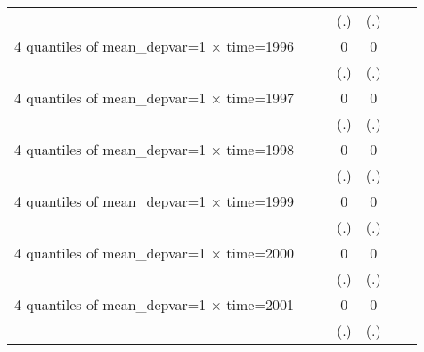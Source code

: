 \begin{table}[htbp]
\begin{tabular}{l*{6}{c}}
                    &                     &                     &         (.)         &         (.)         &                     &                     \\
[1em]
4 quantiles of mean\_depvar=1 $\times$ time=1996&                     &                     &           0         &           0         &                     &                     \\
                    &                     &                     &         (.)         &         (.)         &                     &                     \\
[1em]
4 quantiles of mean\_depvar=1 $\times$ time=1997&                     &                     &           0         &           0         &                     &                     \\
                    &                     &                     &         (.)         &         (.)         &                     &                     \\
[1em]
4 quantiles of mean\_depvar=1 $\times$ time=1998&                     &                     &           0         &           0         &                     &                     \\
                    &                     &                     &         (.)         &         (.)         &                     &                     \\
[1em]
4 quantiles of mean\_depvar=1 $\times$ time=1999&                     &                     &           0         &           0         &                     &                     \\
                    &                     &                     &         (.)         &         (.)         &                     &                     \\
[1em]
4 quantiles of mean\_depvar=1 $\times$ time=2000&                     &                     &           0         &           0         &                     &                     \\
                    &                     &                     &         (.)         &         (.)         &                     &                     \\
[1em]
4 quantiles of mean\_depvar=1 $\times$ time=2001&                     &                     &           0         &           0         &                     &                     \\
                    &                     &                     &         (.)         &         (.)         &                     &                     \\

\end{tabular}
\end{table}
